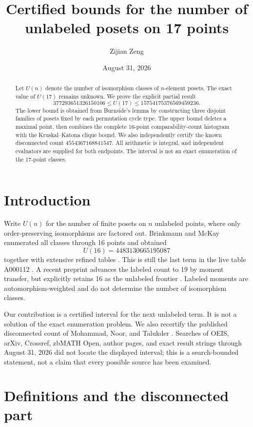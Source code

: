\documentclass[11pt]{amsart}
\title[Bounds for 17-point unlabeled posets]{Certified bounds for the number of unlabeled posets on 17 points}
\author{Zijian Zeng}
\date{August 31, 2026}
\theoremstyle{definition}
\begin{document}
\begin{abstract}
Let $U(n)$ denote the number of isomorphism classes of $n$-element
posets.  The exact value of $U(17)$ remains unknown.  We prove the explicit
partial result
\[
377293651326150106\leq U(17)\leq15754175376569459236.
\]
The lower bound is obtained from Burnside's lemma by constructing three
disjoint families of posets fixed by each permutation cycle type.  The upper
bound deletes a maximal point, then combines the complete 16-point
comparability-count histogram with the Kruskal--Katona clique bound.  We also
independently certify the known disconnected count
$4554367168841547$.  All arithmetic is integral, and independent evaluators
are supplied for both endpoints.  The interval is not an exact enumeration
of the 17-point classes.
\end{abstract}

\maketitle

\section{Introduction}

Write $U(n)$ for the number of finite posets on $n$ unlabeled points, where
only order-preserving isomorphisms are factored out.  Brinkmann and McKay
enumerated all classes through 16 points and obtained
\[
U(16)=4483130665195087
\]
together with extensive refined tables \cite{BrinkmannMcKay2002}.  This is
still the last term in the live table A000112 \cite{OEISA000112}.  A recent
preprint advances the labeled count to 19 by moment transfer, but explicitly
retains 16 as the unlabeled frontier \cite{Ayala2026}.  Labeled moments are
automorphism-weighted and do not determine the number of isomorphism classes.

Our contribution is a certified interval for the next unlabeled term.  It is
not a solution of the exact enumeration problem.  We also recertify the
published disconnected count of Mohammad, Noor, and Talukder
\cite{MohammadNoorTalukder2022}.  Searches of OEIS, arXiv, Crossref, zbMATH
Open, author pages, and exact result strings through August 31, 2026 did not
locate the displayed interval; this is a search-bounded statement, not a
claim that every possible source has been examined.

\section{Definitions and the disconnected part}
\end{document}
